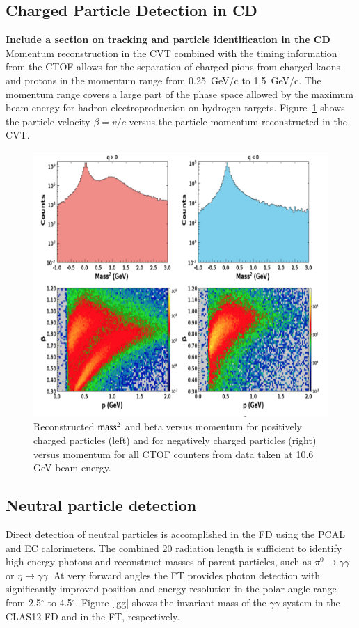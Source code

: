 \documentclass[final,3p,twocolumn]{elsarticle}
\begin{document}
\subsection{\rm Charged Particle Detection in CD} 
{\bf Include a section on tracking and particle identification in the CD}
Momentum reconstruction in the CVT combined with the timing information from the CTOF allows for the separation 
of charged pions from charged kaons and protons in the momentum range from 0.25~GeV/c to 1.5~GeV/c. The momentum
range covers a large part of the phase space allowed by the maximum beam energy for hadron electroproduction 
on hydrogen targets. Figure~\ref{CD-PID} shows the particle velocity $\beta = v/c$ versus the particle momentum 
reconstructed in the CVT.
\begin{figure}[htbp!]
\centerline{\includegraphics[width=1.0\columnwidth]{CTOF-PID.png}}
\caption{Reconstructed $\rm mass^2$ and beta versus momentum for positively charged particles (left) and for negatively charged 
particles (right) versus momentum for all CTOF counters from data taken at 10.6 GeV beam energy.  }
\label{CD-PID}
\end{figure} 


\subsection{\rm Neutral particle detection} 
Direct detection of neutral particles is accomplished in the FD using the PCAL and EC calorimeters. 
The combined 20 radiation length is sufficient to identify high energy photons and reconstruct masses 
of parent particles, such as $\pi^0\to \gamma \gamma$  or $\eta \to \gamma \gamma$. 
 At very forward angles the FT provides photon detection with significantly improved position and 
 energy resolution in the polar angle range from 2.5$^\circ$ to 4.5$^\circ$. Figure~\ref{gg} 
shows the invariant mass of the $\gamma\gamma$ system in the CLAS12 FD and in the FT, respectively. 
\end{document}
